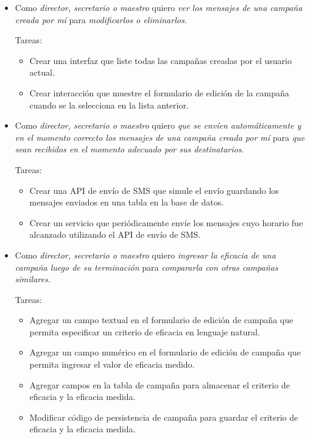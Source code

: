 \documentclass[a4paper, 10pt, twoside]{article}
\newenvironment{stories}{
  \begin{itemize}
}{
  \end{itemize}
}
\newcommand{\story}[3]{
  \item
  Como \emph{#1} quiero \emph{#2} para \emph{#3}.
}
\newenvironment{tasks}{
  Tareas:
  \begin{itemize}
}{
  \end{itemize}
}
\newcommand{\task}[1] {
  \item #1.
}
\begin{document}
\begin{stories}
  \story{director, secretario o maestro}
        {ver los mensajes de una campaña creada por mí}
        {modificarlos o eliminarlos}

  \begin{tasks}
    \task{Crear una interfaz que liste todas las campañas creadas por el usuario actual}
    \task{Crear interacción que muestre el formulario de edición de la campaña cuando se la selecciona en la lista anterior}
  \end{tasks}

  \story{director, secretario o maestro}
        {que se envíen automáticamente y en el momento correcto los mensajes de una campaña creada por mí}
        {que sean recibidos en el momento adecuado por sus destinatarios}

  \begin{tasks}
    \task{Crear una API de envío de SMS que simule el envío guardando los mensajes enviados en una tabla en la base de datos}
    \task{Crear un servicio que periódicamente envíe los mensajes cuyo horario fue alcanzado utilizando el API de envío de SMS}
  \end{tasks}

  \story{director, secretario o maestro}
        {ingresar la eficacia de una campaña luego de su terminación}
        {compararla con otras campañas similares}

  \begin{tasks}
    \task{Agregar un campo textual en el formulario de edición de campaña que permita especificar un criterio de eficacia en lenguaje natural}
    \task{Agregar un campo numérico en el formulario de edición de campaña que permita ingresar el valor de eficacia medido}
    \task{Agregar campos en la tabla de campaña para almacenar el criterio de eficacia y la eficacia medida}
    \task{Modificar código de persistencia de campaña para guardar el criterio de eficacia y la eficacia medida}
  \end{tasks}
\end{stories}
\end{document}
